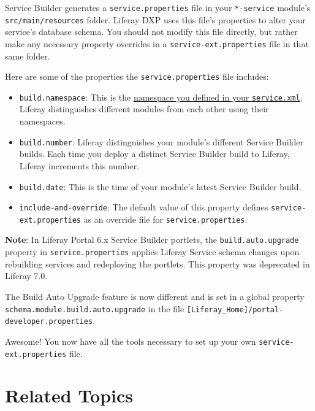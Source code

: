 Service Builder generates a \texttt{service.properties} file in your
\texttt{*-service} module's \texttt{src/main/resources} folder. Liferay
DXP uses this file's properties to alter your service's database schema.
You should not modify this file directly, but rather make any necessary
property overrides in a \texttt{service-ext.properties} file in that
same folder.

Here are some of the properties the \texttt{service.properties} file
includes:

\begin{itemize}
\tightlist
\item
  \texttt{build.namespace}: This is the
  \href{/docs/7-2/appdev/-/knowledge_base/a/creating-the-service-xml-file}{namespace
  you defined in your \texttt{service.xml}}. Liferay distinguishes
  different modules from each other using their namespaces.
\item
  \texttt{build.number}: Liferay distinguishes your module's different
  Service Builder builds. Each time you deploy a distinct Service
  Builder build to Liferay, Liferay increments this number.
\item
  \texttt{build.date}: This is the time of your module's latest Service
  Builder build.
\item
  \texttt{include-and-override}: The default value of this property
  defines \texttt{service-ext.properties} as an override file for
  \texttt{service.properties}.
\end{itemize}

\noindent\hrulefill

\textbf{Note}: In Liferay Portal 6.x Service Builder portlets, the
\texttt{build.auto.upgrade} property in \texttt{service.properties}
applies Liferay Service schema changes upon rebuilding services and
redeploying the portlets. This property was deprecated in Liferay 7.0.

The Build Auto Upgrade feature is now different and is set in a global
property \texttt{schema.module.build.auto.upgrade} in the file
\texttt{{[}Liferay\_Home{]}/portal-developer.properties}.

\noindent\hrulefill

Awesome! You now have all the tools necessary to set up your own
\texttt{service-ext.properties} file.

\section{Related Topics}\label{related-topics-14}

